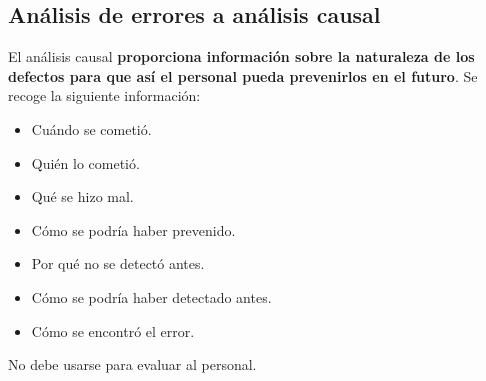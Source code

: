 \subsection{Análisis de errores a análisis causal}
El análisis causal \textbf{proporciona información sobre la naturaleza de los defectos para que así el personal pueda prevenirlos en el futuro}. Se recoge la siguiente información:
\begin{itemize}
    \item Cuándo se cometió.
    \item Quién lo cometió.
    \item Qué se hizo mal.
    \item Cómo se podría haber prevenido.
    \item Por qué no se detectó antes.
    \item Cómo se podría haber detectado antes.
    \item Cómo se encontró el error.
\end{itemize}

No debe usarse para evaluar al personal.

